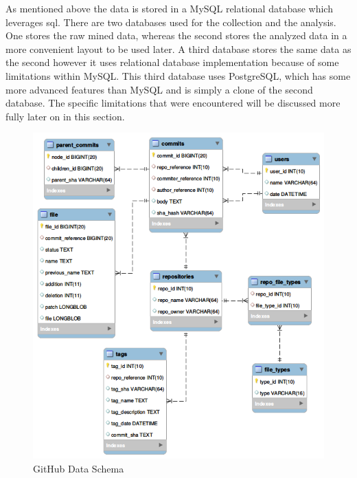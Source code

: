 As mentioned above the data is stored in a MySQL relational database which leverages \gls{sql}. There are two databases used for the collection and the analysis. One stores the raw mined data, whereas the second stores the analyzed data in a more convenient layout to be used later. A third database stores the same data as the second however it uses relational database implementation because of some limitations within MySQL. This third database uses PostgreSQL, which has some more advanced features than MySQL and is simply a clone of the second database. The specific limitations that were encountered will be discussed more fully later on in this section.

\begin{figure}[!ht]
    \centering
        \includegraphics[width=1.0\textwidth]{images/github_data_schema}
    \caption{GitHub Data Schema}
    \label{fig:github_data_schema}
\end{figure}


